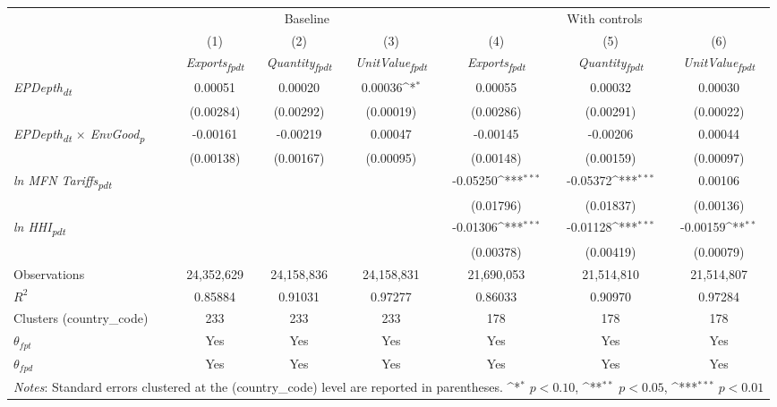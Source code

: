 {
\def\sym#1{\ifmmode^{#1}\else\(^{#1}\)\fi}
\begin{tabular}{l*{6}{c}}
\toprule
&\multicolumn{3}{c}{Baseline}&\multicolumn{3}{c}{With controls}\\\cmidrule(lr){2-4}\cmidrule(lr){5-7}
&(1)&(2)&(3)&(4)&(5)&(6)\\
&\textit{Exports\textsubscript{fpdt}}&\textit{Quantity\textsubscript{fpdt}}&\textit{UnitValue\textsubscript{fpdt}}&\textit{Exports\textsubscript{fpdt}}&\textit{Quantity\textsubscript{fpdt}}&\textit{UnitValue\textsubscript{fpdt}}\\
\midrule
\textit{EPDepth\textsubscript{dt}} & 0.00051 & 0.00020 & 0.00036\sym{*} & 0.00055 & 0.00032 & 0.00030\\
 & (0.00284) & (0.00292) & (0.00019) & (0.00286) & (0.00291) & (0.00022)\\
\addlinespace
\textit{EPDepth\textsubscript{dt} $\times$ EnvGood\textsubscript{p}} & -0.00161 & -0.00219 & 0.00047 & -0.00145 & -0.00206 & 0.00044\\
 & (0.00138) & (0.00167) & (0.00095) & (0.00148) & (0.00159) & (0.00097)\\
\addlinespace
\textit{ln MFN Tariffs\textsubscript{pdt}} &  &  &  & -0.05250\sym{***} & -0.05372\sym{***} & 0.00106\\
 &  &  &  & (0.01796) & (0.01837) & (0.00136)\\
\addlinespace
\textit{ln HHI\textsubscript{pdt}} &  &  &  & -0.01306\sym{***} & -0.01128\sym{***} & -0.00159\sym{**}\\
 &  &  &  & (0.00378) & (0.00419) & (0.00079)\\
\midrule
Observations & 24,352,629 & 24,158,836 & 24,158,831 & 21,690,053 & 21,514,810 & 21,514,807\\
$R^{2}$ & 0.85884 & 0.91031 & 0.97277 & 0.86033 & 0.90970 & 0.97284\\
Clusters (country_code) & 233 & 233 & 233 & 178 & 178 & 178\\
$\theta_{fpt}$ & Yes & Yes & Yes & Yes & Yes & Yes\\
$\theta_{fpd}$ & Yes & Yes & Yes & Yes & Yes & Yes\\
\bottomrule
\multicolumn{7}{l}{\footnotesize \textit{Notes}: Standard errors clustered at the (country_code) level are reported in parentheses. \sym{*} \(p<0.10\), \sym{**} \(p<0.05\), \sym{***} \(p<0.01\)}\\
\end{tabular}
}
